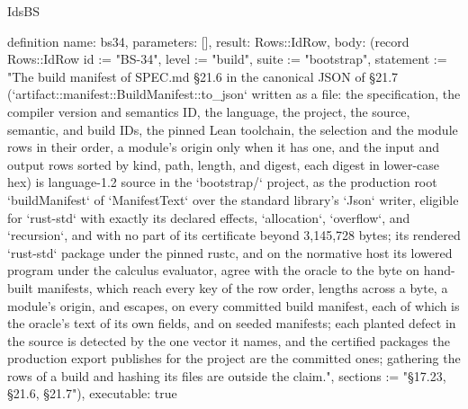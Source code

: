 \begin{lexlean}{IdsBS}
\begin{semanticmodule}
definition{
  name: bs34,
  parameters: [],
  result: Rows::IdRow,
  body: (record Rows::IdRow {id := "BS-34", level := "build", suite := "bootstrap", statement := "The build manifest of SPEC.md §21.6 in the canonical JSON of §21.7 (`artifact::manifest::BuildManifest::to_json` written as a file: the specification, the compiler version and semantics ID, the language, the project, the source, semantic, and build IDs, the pinned Lean toolchain, the selection and the module rows in their order, a module's origin only when it has one, and the input and output rows sorted by kind, path, length, and digest, each digest in lower-case hex) is language-1.2 source in the `bootstrap/` project, as the production root `buildManifest` of `ManifestText` over the standard library's `Json` writer, eligible for `rust-std` with exactly its declared effects, `allocation`, `overflow`, and `recursion`, and with no part of its certificate beyond 3,145,728 bytes; its rendered `rust-std` package under the pinned rustc, and on the normative host its lowered program under the calculus evaluator, agree with the oracle to the byte on hand-built manifests, which reach every key of the row order, lengths across a byte, a module's origin, and escapes, on every committed build manifest, each of which is the oracle's text of its own fields, and on seeded manifests; each planted defect in the source is detected by the one vector it names, and the certified packages the production export publishes for the project are the committed ones; gathering the rows of a build and hashing its files are outside the claim.", sections := "§17.23, §21.6, §21.7"}),
  executable: true
}
\end{semanticmodule}
\end{lexlean}
